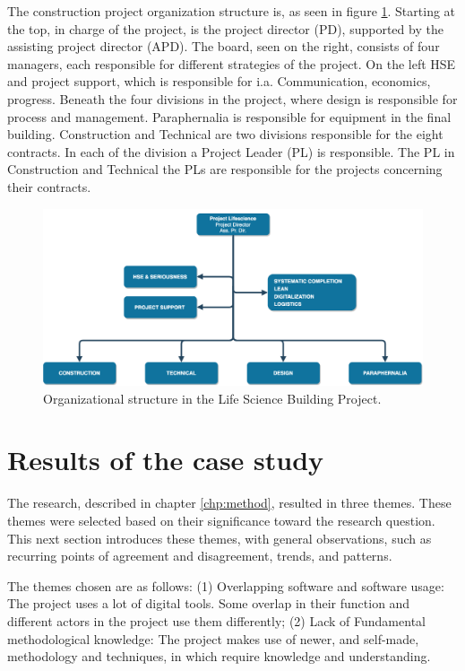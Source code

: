 The construction project organization structure is, as seen in figure \ref{fig:project_structure}. Starting at the top, in charge of the project, is the project director (PD), supported by the assisting project director (APD). The board, seen on the right, consists of four managers, each responsible for different strategies of the project. On the left HSE and project support, which is responsible for i.a. Communication, economics, progress. Beneath the four divisions in the project, where design is responsible for process and management. Paraphernalia is responsible for equipment in the final building. Construction and Technical are two divisions responsible for the eight contracts. In each of the division a Project Leader (PL) is responsible. The PL in Construction and Technical the PLs are responsible for the projects concerning their contracts.

\begin{figure}
    \centering
    \includegraphics[width=\textwidth]{fig/lvb_diagram.png}
    \caption{Organizational structure in the Life Science Building Project.}
    \label{fig:project_structure}
\end{figure}

\section{Results of the case study}
The research, described in chapter \ref{chp:method}, resulted in three themes. These themes were selected based on their significance toward the research question. This next section introduces these themes, with general observations, such as recurring points of agreement and disagreement, trends, and patterns. 

The themes chosen are as follows: (1) Overlapping software and software usage: The project uses a lot of digital tools. Some overlap in their function and different actors in the project use them differently; (2) Lack of Fundamental methodological knowledge: The project makes use of newer, and self-made, methodology and techniques, in which require knowledge and understanding.

